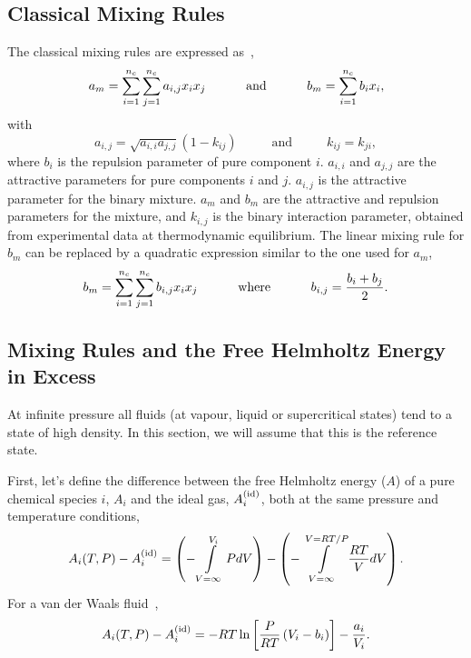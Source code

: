 \subsection{Classical Mixing Rules}\label{Chapter:EOSPR:Section:MixRules:Classical}
The classical mixing rules are expressed as~\citep{Sandler_Book}, 
  \begin{equation}
    a_{m} = \summation_{i=1}^{n_{c}}\summation_{j=1}^{n_{c}} a_{i,j}x_{i}x_{j}\hspace{1cm}\text{ and }\hspace{1cm} b_{m} = \summation_{i=1}^{n_{c}}b_{i}x_{i},
  \end{equation}
with
  \begin{displaymath}
     a_{i,j}=\sqrt{a_{i,i}a_{j,j}}\left(1-k_{ij}\right) \hspace{1cm}\text{ and }\hspace{1cm} k_{ij}=k_{ji},
  \end{displaymath}
where $b_{i}$ is the repulsion parameter of pure component $i$. $a_{i,i}$ and $a_{j,j}$ are the attractive parameters for pure components $i$ and $j$. $a_{i,j}$ is the attractive parameter for the binary mixture. $a_{m}$ and $b_{m}$ are the attractive and repulsion parameters for the mixture, and $k_{i,j}$ is the binary interaction parameter, obtained from experimental data at thermodynamic equilibrium. The linear mixing rule for $b_{m}$ can be replaced by a quadratic expression similar to the one used for $a_{m}$,
  \begin{equation}
     b_{m} = \summation_{i=1}^{n_{c}}\summation_{j=1}^{n_{c}} b_{i,j}x_{i}x_{j}\hspace{1cm}\text{ where }\hspace{1cm} b_{i,j} = \frc{b_{i}+b_{j}}{2}.
  \end{equation}


\subsection{Mixing Rules and the Free Helmholtz Energy in Excess}\label{Chapter:EOSPR:Section:MixRules:Helmholtz}
At infinite pressure all fluids (at vapour, liquid or supercritical states) tend to a state of high density. In this section, we will assume that this is the reference state. 

First, let's define the difference between the free Helmholtz energy ($A$) of a pure chemical species $i$, $A_{i}$ and the ideal gas, $\mfr[A]{i}{\text{id}}$, both at the same pressure and temperature conditions,
   \begin{equation}
      A_{i}(T,P) - \mfr[A]{i}{\text{id}} = \left(-\int\limits_{V=\infty}^{V_{i}} PdV\right) - \left(-\int\limits_{V=\infty}^{V=RT/P}\frc{RT}{V}dV\right).
   \end{equation}
For a van der Waals fluid~\citep{SmithVanNess_Book},
   \begin{equation}
      A_{i}(T,P) - \mfr[A]{i}{\text{id}} = -RT\ln{\left[\frc{P}{RT}\left(V_{i}-b_{i}\right)\right] - \frc{a_{i}}{V_{i}}}.\label{Chapter:EOSPR:Section:MixRules:Helmholtz:Eqn:vdWFluid}
   \end{equation}


